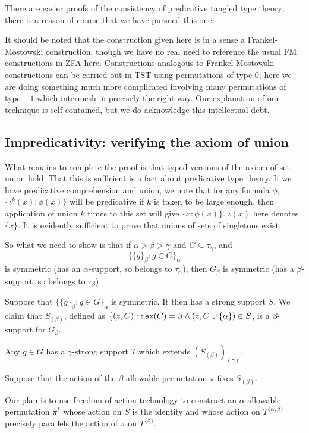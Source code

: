 \documentclass[112pt]{article}
\begin{document}
There are easier proofs of the consistency of predicative tangled type theory;  there is a reason of course that we have pursued this one.

It should be noted that the construction given here is in a sense a Frankel-Mostowski construction, though we have no real need to reference the usual
FM constructions in ZFA here.  Constructions analogous to Frankel-Mostowski constructions can be carried out in TST using permutations of type 0;  here we are doing something much more complicated involving many permutations of type $-1$ which intermesh in precisely the right way.  Our explanation of our technique is self-contained, but we do acknowledge this intellectual debt.



\newpage
\subsection{Impredicativity:  verifying the axiom of union}

What remains to complete the proof is that typed versions of the axiom of set union hold.  That this is sufficient is a fact about predicative type theory.
If we have predicative comprehension and union, we note that for any formula $\phi$, $\{\iota^k(x):\phi(x)\}$ will be predicative if $k$ is taken to be large enough, then application of union $k$ times to this set will give $\{x:\phi(x)\}$.  $\iota(x)$ here denotes $\{x\}$.  It is evidently sufficient to prove that unions of sets of singletons exist.

So what we need to show is that if  $\alpha>\beta>\gamma$ and $G \subseteq \tau_\gamma$, and $$\{\{g\}_\beta:g \in G\}_\alpha$$ is symmetric (has an $\alpha$-support, so belongs to $\tau_\alpha$), then $G_\beta$ is symmetric (has a $\beta$-support, so belongs to $\tau_\beta$).

Suppose that $\{\{g\}_\beta:g \in G\}_\alpha$ is symmetric.  It then has a strong support $S$.  We claim that $S_{(\beta)}$, defined as $\{(z,C): {\tt max}(C)=\beta \wedge (z,C\cup \{\alpha\}) \in S$,  is a $\beta$-support for $G_\beta$.

Any $g \in G$ has a $\gamma$-strong support $T$ which extends $(S_{(\beta)})_{(\gamma)}$. 

Suppose that the action of the $\beta$-allowable permutation $\pi$ fixes $S_{(\beta)}$.

Our plan is to use freedom of action technology to construct an $\alpha$-allowable permutation $\pi^*$ whose action on $S$ is the identity
and whose action on $T^{\{\alpha,\beta\}}$ precisely parallels the action of $\pi$ on $T^{\{\beta\}}$.
\end{document}
